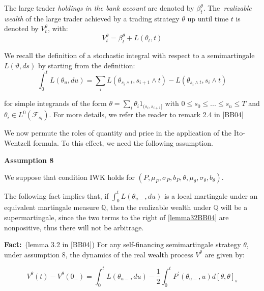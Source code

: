\documentclass{article}
\begin{document}
The large trader \textit{holdings in the bank account} are denoted by $\beta
_{t}^{\theta }$. The\textit{\ realizable wealth} of the large trader
achieved by a trading strategy $\theta $ up until time $t$ is denoted by $%
V_{t}^{\theta }$, with:%
\begin{equation*}
V_{t}^{\theta }=\beta _{t}^{\theta }+L(\theta _{t},t)
\end{equation*}

We recall the definition of a stochastic integral with respect to a
semimartingale $L(\vartheta ,ds)$ by starting from the definition:%
\begin{equation*}
\int_{0}^{t}L(\theta _{u},du)=\sum_{i}L(\theta _{s_{i}\wedge
t},s_{i+1}\wedge t)-L(\theta _{s_{i}\wedge t},s_{i}\wedge t)
\end{equation*}

for simple integrands of the form $\theta =\sum_{i}\theta
_{i}1_{(s_{i},s_{i+1}]}$ with $0\leq s_{0}\leq ...\leq s_{n}\leq T$ and $%
\theta _{i}\in L^{0}(\mathcal{F}_{s_{i}})$. For more details, we refer the
reader to remark 2.4 in [BB04]\ 

\bigskip

We now permute the roles of quantity and price in the application of the
Ito-Wentzell formula. To this effect, we need the following assumption.

\bigskip

\textbf{Assumption 8}

We suppose that condition IWK holds for $(P,\mu _{P},\sigma
_{P},b_{P},\theta ,\mu _{\theta },\sigma _{\theta },b_{\theta })$.\bigskip

The following fact implies that, if $\int_{0}^{t}L(\theta _{u-},du)$ is a
local martingale under an equivalent martingale measure $\mathbb{Q}$, then
the realizable wealth under $\mathbb{Q}$ will be a supermartingale, since
the two terms to the right of \ref{lemma32BB04} are nonpositive, thus there
will not be arbitrage.

\bigskip

\textbf{Fact:}\ (lemma 3.2 in [BB04]) For any self-financing semimartingale
strategy $\theta $, under assumption 8, the dynamics of the real wealth
process $V^{\theta }$ are given by:

\begin{equation}
V^{\theta }(t)-V^{\theta }(0_{-})=\int_{0}^{t}L(\theta _{u-},du)-\frac{1}{2}%
\int_{0}^{t}P^{\prime }(\theta _{u-},u)d[\theta ,\theta ]_{s}
\label{lemma32BB04}
\end{equation}%
\bigskip
\end{document}
